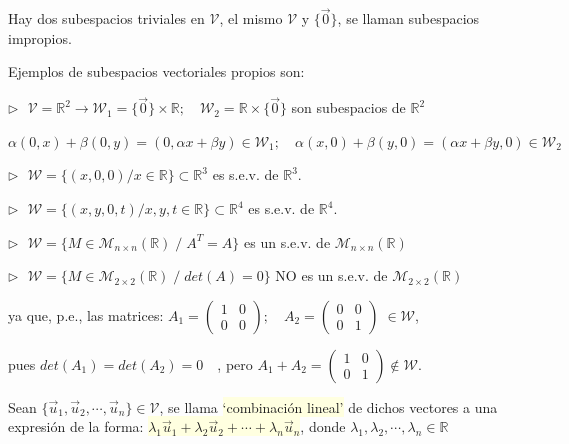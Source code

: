 \begin{cuadro-gris}
Hay dos subespacios triviales en $\mathcal V$, el mismo 	$\mathcal V$ y $\{\vec 0\}$, se llaman subespacios impropios.

Ejemplos de subespacios vectoriales propios son:


$\triangleright \ \ \ \mathcal V = \mathbb R^2 \to \mathcal W_1= \{\vec 0\} \times \mathbb R; \quad \mathcal W_2= \mathbb R \times \{\vec 0\}$ son subespacios de $\mathbb R^2$

\textcolor{gris}{ \footnotesize{$\alpha (0,x) + \beta (0,y)=(0,\alpha x + \beta y) \in \mathcal W_1 ; \quad 
\alpha (x,0) + \beta (y,0)=(\alpha x + \beta y,0) \in \mathcal W_2 $}}

$\triangleright \ \ \ \mathcal W=\{ (x,0,0) / x \in \mathbb R \} \subset \mathbb R^3$ es s.e.v. de $\mathbb R^3$.

$\triangleright \ \ \ \mathcal W=\{ (x,y,0,t) / x,y,t \in \mathbb R \} \subset \mathbb R^4$ es s.e.v. de $\mathbb R^4$.

$\triangleright \ \ \ \mathcal W=\{ M\in \mathcal M_{n \times n}(\mathbb R) \; / \; A^T=A\}$ es un s.e.v. de $\mathcal M_{n \times n}(\mathbb R)$

$\triangleright \ \ \ \mathcal W=\{ M\in \mathcal M_{2 \times 2}(\mathbb R) \; / \; det(A)=0\}$ NO es un s.e.v. de $\mathcal M_{2 \times 2}(\mathbb R)$

\vspace{2mm} \textcolor{gris}{\small{ya que, p.e., las matrices: 
$A_1=\left( \begin{matrix} 1&0\\0&0 \end{matrix} \right); \quad 
A_2=\left( \begin{matrix} 0&0\\0&1 \end{matrix} \right) \; \in \mathcal W$,}}
 
\textcolor{gris}{ \small{pues $det(A_1)=det(A_2)=0\quad $, pero $A_1+A_2= \left( \begin{matrix} 1&0\\0&1 \end{matrix} \right) \notin \mathcal W$}\normalsize{.}}
\end{cuadro-gris}	


\begin{definition}

Sean $\{ \vec u_1, \vec u_2, \cdots, \vec u_n \} \in \mathcal V$, se llama \colorbox{LightYellow}{`combinación lineal'} de dichos vectores a una expresión de la forma: 
\colorbox{LightYellow}{$\lambda_1 \vec u_1 + \lambda_2 \vec u_2 + \cdots +\lambda_n \vec u_n$},
 donde $\lambda_1, \lambda_2, \cdots, \lambda_n \in \mathbb R$
\end{definition}

